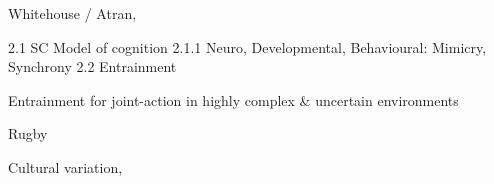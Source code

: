 \documentclass[12pt]{report}
\begin{document}
Whitehouse / Atran,





















2.1 SC Model of cognition
  2.1.1 Neuro, Developmental, Behavioural:  Mimicry, Synchrony
2.2 Entrainment




Entrainment for joint-action in highly complex & uncertain environments

Rugby


Cultural variation,




\end{document}

